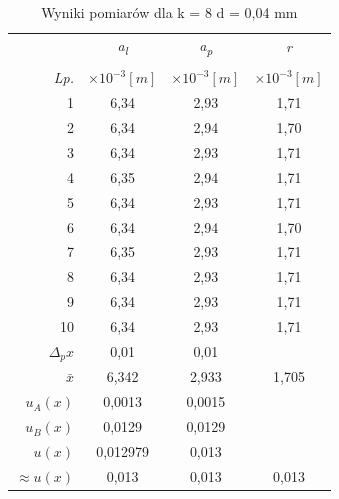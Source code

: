 \documentclass[polish, 11pt, a4paper]{article}
\begin{document}
\begin{table}[H]
\begin{minipage}{.5\textwidth}
			\caption{Wyniki pomiarów dla k = 8 \newline d = 0,04 mm}
			\begin{tabular}{|r|c|c|c|} \hline
					&	\textit{a\textsubscript{l}}	&	\textit{a\textsubscript{p}}	&	\textit{r}	\\
				&&& \\[-1em]
				\textit{Lp.}& \(\times{10^{-3} [m]}\)& \(\times{10^{-3} [m]}\)& \(\times{10^{-3} [m]}\) \\\hline
				1	&	6,34	&	2,93	&	1,71	\\\hline
				2	&	6,34	&	2,94	&	1,70	\\\hline
				3	&	6,34	&	2,93	&	1,71	\\\hline
				4	&	6,35	&	2,94	&	1,71	\\\hline
				5	&	6,34	&	2,93	&	1,71	\\\hline
				6	&	6,34	&	2,94	&	1,70	\\\hline
				7	&	6,35	&	2,93	&	1,71	\\\hline
				8	&	6,34	&	2,93	&	1,71	\\\hline
				9	&	6,34	&	2,93	&	1,71	\\\hline
				10	&	6,34	&	2,93	&	1,71	\\\hline
				\(\Delta{_px}\)	&	0,01	&	0,01	&		\\\hline
				\(\bar{x}\)	&	6,342	&	2,933	&	1,705	\\\hline
				\(u_A(x)\)	&	0,0013	&	0,0015	&		\\\hline
				\(u_B(x)\)	&	0,0129	&	0,0129	&		\\\hline
				\(u(x)\)	&	0,012979	&	0,013	&		\\\hline
				\(\approx{u(x)}\)	&	0,013	&	0,013	&	0,013	\\\hline
			\end{tabular}
		

\end{minipage}
\end{table}
\end{document}
